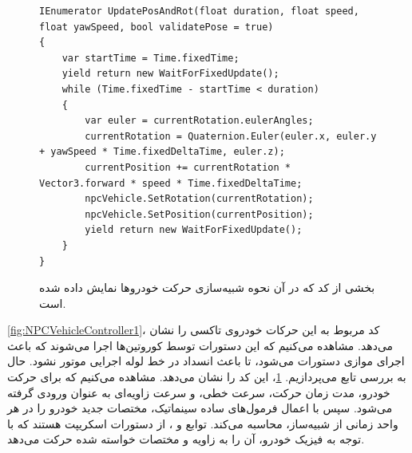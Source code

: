 \begin{figure}[h!]
    \centering
    \begin{latin}
        \begin{lstlisting}[style=codecs]
IEnumerator UpdatePosAndRot(float duration, float speed, float yawSpeed, bool validatePose = true)
{
    var startTime = Time.fixedTime;
    yield return new WaitForFixedUpdate();
    while (Time.fixedTime - startTime < duration)
    {
        var euler = currentRotation.eulerAngles;
        currentRotation = Quaternion.Euler(euler.x, euler.y + yawSpeed * Time.fixedDeltaTime, euler.z);
        currentPosition += currentRotation * Vector3.forward * speed * Time.fixedDeltaTime;
        npcVehicle.SetRotation(currentRotation);
        npcVehicle.SetPosition(currentPosition);
        yield return new WaitForFixedUpdate();
    }
}
        \end{lstlisting}
    \end{latin}
    \caption{بخشی از کد  که در آن نحوه شبیه‌سازی حرکت خودروها نمایش داده شده است.}
    \label{fig:NPCVehicleController2}
\end{figure}

\cref{fig:NPCVehicleController1}، کد مربوط به این حرکات خودروی تاکسی را نشان می‌دهد. مشاهده می‌کنیم که این دستورات توسط کوروتین‌ها اجرا می‌شوند که باعث اجرای موازی دستورات می‌شود، تا باعث انسداد در خط لوله اجرایی موتور  نشود. حال به بررسی تابع  می‌پردازیم. \cref{fig:NPCVehicleController2}، این کد را نشان می‌دهد. مشاهده می‌کنیم که برای حرکت خودرو، مدت زمان حرکت، سرعت‌ خطی، و سرعت زاویه‌ای به عنوان ورودی گرفته می‌شود. سپس با اعمال فرمول‌های ساده سینماتیک، مختصات جدید خودرو را در هر واحد زمانی از شبیه‌ساز، محاسبه می‌کند. توابع  و ، از دستورات اسکریپت  هستند که با توجه به فیزیک خودرو، آن را به زاویه و مختصات خواسته شده حرکت می‌دهد.


